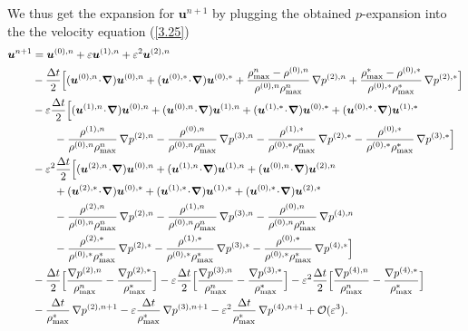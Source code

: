 \documentclass[A4paper,12pt,twoside]{article}
\newenvironment{proof}{{\flushleft \bf Proof:}}{}
\numberwithin{equation}{section}
\numberwithin{figure}{section}
\numberwithin{table}{section}
\def\bnabla{\bm{\nabla}}
\newcommand{\dt}{\Delta t}
\newcommand{\ve}{\varepsilon}
\newcommand\eref[1]{(\ref{#1})}
\begin{document}
\begin{proof}
We thus get the expansion for $\bm u^{n+1}$ by plugging the obtained $p$-expansion
into the the velocity equation \eref{3.25}
$$\begin{aligned}
	\bm u^{n+1}&=\bm u^{(0),n}+\ve \bm u^{(1),n}+\ve^2 \bm u^{(2),n}\\
	&-\frac{\dt}{2} \Big[(\bm u^{(0),n}\!\cdot\!\bnabla)\bm u^{(0),n}+
	(\bm u^{(0),*}\!\cdot\!\bnabla)\bm u^{(0),*}+\frac{\rho_{\max}^n-\rho^{(0),n}}{\rho^{(0),n}\rho_{\max}^n}\,\nabla p^{(2),n}+\frac{\rho_{\max}^*-\rho^{(0),*}}{\rho^{(0),*}\rho_{\max}^*}\,\nabla p^{(2),*} \Big]
	\\&-\ve\frac{\dt}{2} \Big[(\bm u^{(1),n}\!\cdot\!\bnabla)\bm u^{(0),n}+(\bm u^{(0),n}\!\cdot\!\bnabla)\bm u^{(1),n}+(\bm u^{(1),*}\!\cdot\!\bnabla)\bm u^{(0),*}+(\bm u^{(0),*}\!\cdot\!\bnabla)\bm u^{(1),*}\\
	&\qquad-\frac{\rho^{(1),n}}{\rho^{(0),n}\rho_{\max}^n}\,\nabla p^{(2),n}-\frac{\rho^{(0),n}}{\rho^{(0),n}\rho_{\max}^n}\,\nabla p^{(3),n}
	-\frac{\rho^{(1),*}}{\rho^{(0),*}\rho_{\max}^n}\,\nabla p^{(2),*}-\frac{\rho^{(0),*}}{\rho^{(0),*}\rho_{\max}^*}\,\nabla p^{(3),*}\Big]\\
	&-\ve^2\frac{\dt}{2} \Big[
	(\bm u^{(2),n}\!\cdot\!\bnabla)\bm u^{(0),n}
	+(\bm u^{(1),n}\!\cdot\!\bnabla)\bm u^{(1),n}
	+(\bm u^{(0),n}\!\cdot\!\bnabla)\bm u^{(2),n}\\
	&\qquad +(\bm u^{(2),*}\!\cdot\!\bnabla)\bm u^{(0),*}
	+(\bm u^{(1),*}\!\cdot\!\bnabla)\bm u^{(1),*}
	+(\bm u^{(0),*}\!\cdot\!\bnabla)\bm u^{(2),*} \\
	&\qquad
	-\frac{\rho^{(2),n}}{\rho^{(0),n}\rho_{\max}^n}\,\nabla p^{(2),n}
	-\frac{\rho^{(1),n}}{\rho^{(0),n}\rho_{\max}^n}\,\nabla p^{(3),n}
	-\frac{\rho^{(0),n}}{\rho^{(0),n}\rho_{\max}^n}\,\nabla p^{(4),n}\\
	&\qquad
	-\frac{\rho^{(2),*}}{\rho^{(0),*}\rho_{\max}^*}\,\nabla p^{(2),*}
	-\frac{\rho^{(1),*}}{\rho^{(0),*}\rho_{\max}^*}\,\nabla p^{(3),*}
	-\frac{\rho^{(0),*}}{\rho^{(0),*}\rho_{\max}^*}\,\nabla p^{(4),*}
	\Big]\\
	&-\frac{\dt}{2}\Big[ \frac{\nabla p^{(2),n}}{\rho_{\max}^n} - \frac{\nabla p^{(2),*}}{\rho_{\max}^*}\Big]
	-\ve\frac{\dt}{2}\Big[ \frac{\nabla p^{(3),n}}{\rho_{\max}^n} - \frac{\nabla p^{(3),*}}{\rho_{\max}^*}\Big] 
	-\ve^2\frac{\dt}{2}\Big[ \frac{\nabla p^{(4),n}}{\rho_{\max}^n} - \frac{\nabla p^{(4),*}}{\rho_{\max}^*}\Big]\\
	&-\frac{\dt}{ \rho_{\max}^*}\,\nabla p^{(2),n+1}-\ve\frac{\dt}{ \rho_{\max}^*}\,\nabla p^{(3),n+1}-\ve^2\frac{\dt}{ \rho_{\max}^*}\,\nabla p^{(4),n+1}+{\cal O}(\ve^3).

\end{aligned}$$
\end{proof}
\end{document}
